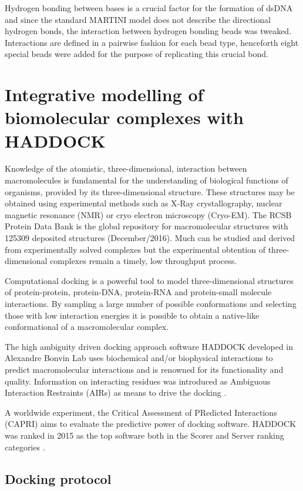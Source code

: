 \documentclass[
	12pt,				%
	openright,			%
	twoside,			%
	a4paper,			%
	english,			%
	french,				%
	spanish,			%
	brazil,				%
	]{abntex2}
\begin{document}
Hydrogen bonding between bases is a crucial factor for the formation of dsDNA and since the standard MARTINI model does not describe the directional hydrogen bonds, the interaction between hydrogen bonding beads was tweaked. Interactions are defined in a pairwise fashion for each bead type, henceforth eight special beads were added for the purpose of replicating this crucial bond. 

\section{Integrative modelling of biomolecular complexes with HADDOCK}

Knowledge of the atomistic, three-dimensional, interaction between macromolecules is fundamental for the understanding of biological functions of organisms, provided by its three-dimensional structure. These structures may be obtained using experimental methods such as X-Ray crystallography, nuclear magnetic resonance (NMR) or cryo electron microscopy (Cryo-EM). The RCSB Protein Data Bank \cite{Berman2000} is the global repository for macromolecular structures with 125309 deposited structures (December/2016). Much can be studied and derived from experimentally solved complexes but the experimental obtention of three-dimensional complexes remain a timely, low throughput process.

Computational docking is a powerful tool to model three-dimensional structures of protein-protein, protein-DNA, protein-RNA and protein-small molecule interactions. By sampling a large number of possible conformations and selecting those with low interaction energies it is possible to obtain a native-like conformational of a macromolecular complex.

The high ambiguity driven docking approach software HADDOCK developed in Alexandre Bonvin Lab uses biochemical and/or biophysical interactions to predict macromolecular interactions and is renowned for its functionality and quality. Information on interacting residues was introduced as Ambiguous Interaction Restraints (AIRs) as means to drive the docking \cite{Dominguez2003}.

A worldwide experiment, the Critical Assessment of PRedicted Interactions (CAPRI) \cite{Janin2002} aims to evaluate the predictive power of docking software. HADDOCK was ranked in 2015 as the top software both in the Scorer and Server ranking categories \cite{HADDOCKCAPRI}.

\subsection{Docking protocol}
\end{document}
